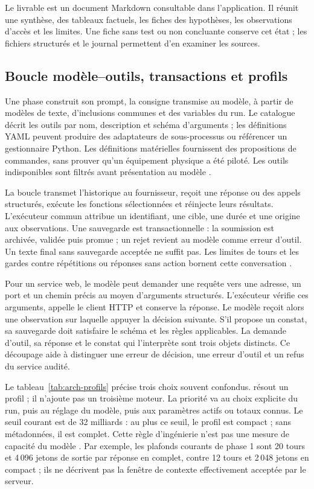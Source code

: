 \documentclass[11pt,a4paper]{article}
\DeclareRobustCommand{\code}[1]{{\small\path{#1}}}
\begin{document}
Le livrable \code{06_report.md} est un document Markdown consultable dans
l'application. Il réunit une synthèse, des tableaux factuels, les fiches des
hypothèses, les observations d'accès et les limites. Une fiche sans test ou
non concluante conserve cet état ; les fichiers structurés et le journal
\code{tool_calls.jsonl} permettent d'en examiner les sources.

\subsection{Boucle modèle--outils, transactions et profils}
Une phase construit son prompt, la consigne transmise au modèle, à partir
de modèles de texte, d'inclusions
communes et des variables du run. Le catalogue décrit les outils par nom,
description et schéma d'arguments ; les définitions YAML peuvent produire des
adaptateurs de sous-processus ou référencer un gestionnaire Python. Les
définitions matérielles fournissent des propositions de commandes, sans prouver
qu'un équipement physique a été piloté. Les outils indisponibles sont filtrés
avant présentation au modèle \cite{arch-prompts,arch-outils}.

La boucle transmet l'historique au fournisseur, reçoit une réponse ou des
appels structurés, exécute les fonctions sélectionnées et réinjecte leurs
résultats. L'exécuteur commun attribue un identifiant, une cible, une durée
et une origine aux observations. Une sauvegarde est transactionnelle : la
soumission est archivée, validée puis promue ; un rejet revient au modèle
comme erreur d'outil. Un texte final sans sauvegarde acceptée ne suffit pas.
Les limites de tours et les gardes contre répétitions ou réponses sans action
bornent cette conversation \cite{arch-provider,arch-executeur,arch-runner}.

Pour un service web, le modèle peut demander une requête vers une adresse,
un port et un chemin précis au moyen d'arguments structurés. L'exécuteur
vérifie ces arguments, appelle le client HTTP et conserve la réponse. Le
modèle reçoit alors une observation sur laquelle appuyer la décision suivante.
S'il propose un constat, sa sauvegarde doit satisfaire le schéma et les règles
applicables. La demande d'outil, sa réponse et le constat qui l'interprète
sont trois objets distincts. Ce découpage aide à distinguer une erreur de
décision, une erreur d'outil et un refus du service audité.

Le tableau~\ref{tab:arch-profils} précise trois choix souvent confondus.
\code{auto} résout un profil ; il n'ajoute pas un troisième moteur.
La priorité va au choix explicite du run, puis au réglage du modèle, puis
aux paramètres actifs ou totaux connus. Le seuil courant est de 32 milliards :
au plus ce seuil, le profil est compact ; sans métadonnées, il est complet.
Cette règle d'ingénierie n'est pas une mesure de capacité du modèle
\cite{arch-profils}. Par exemple, les plafonds courants de phase 1 sont
20 tours et 4\,096 jetons de sortie par réponse en complet, contre
12 tours et 2\,048 jetons en compact ; ils ne décrivent pas la fenêtre
de contexte effectivement acceptée par le serveur.
\end{document}
